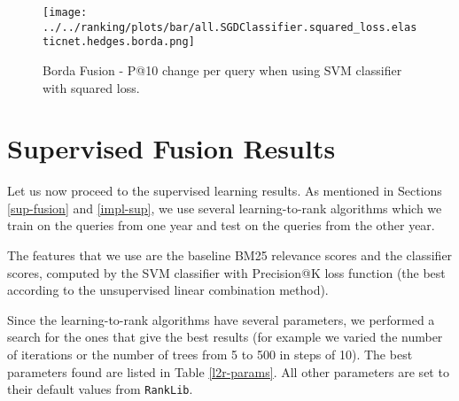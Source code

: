 \begin{figure}
\centerline{
  \texttt{[image: ../../ranking/plots/bar/all.SGDClassifier.squared\_loss.elasticnet.hedges.borda.png]}
  }
  \caption{Borda Fusion - P@10 change per query when using SVM classifier with squared loss.}
  \label{borda-query}
\end{figure}


\section{Supervised Fusion Results}
Let us now proceed to the supervised learning results. As mentioned in Sections \ref{sup-fusion} and \ref{impl-sup}, we use several
learning-to-rank algorithms which we train on the queries from one year and test on the queries from the other year.

The features that we use are the baseline BM25 relevance scores and the classifier scores, computed by the SVM
classifier with Precision@K loss function (the best according to the unsupervised linear combination method).

Since the learning-to-rank algorithms have several parameters, we performed a search for the ones that give the best
results (for example we varied the number of iterations or the number of trees from 5 to 500 in steps of 10).
The best parameters found are listed in Table \ref{l2r-params}. All other parameters are set to their default values from \texttt{RankLib}.

\begin{table}[h!]
\centering
\caption{Best parameters found for the learning-to-rank algorithms.}
\label{l2r-params}
\end{table}

